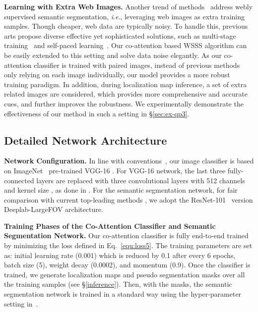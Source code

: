 \documentclass[runningheads]{llncs}
\newcommand{\ie}{\textit{i}.\textit{e}.}
\begin{document}
\noindent\textbf{Learning with Extra Web Images.}  Another trend of methods~\cite{jin2017webly,hong2017weakly,shen2018bootstrapping,wei2016stc}  address webly supervised semantic segmentation, \ie, leveraging web images as extra training samples. Though cheaper,  web data are typically noisy. To handle this,  previous arts propose diverse effective yet sophisticated solutions, such as multi-stage training~\cite{jin2017webly} and self-paced learning~\cite{wei2016stc}. Our co-attention based WSSS algorithm can be easily extended to this setting and solve data noise elegantly. As our co-attention classifier is trained with paired images, instead of previous methods  only relying on each image individually, our model provides a more robust training paradigm. In addition, during localization map inference, a set of extra related images are considered, which provides more comprehensive and accurate cues, and further improves the robustness. We experimentally demonstrate the effectiveness of our method in such a setting in \S\ref{sec:ex-qp3}.





\vspace{-6pt}
\subsection{Detailed Network Architecture}
\vspace{-2pt}
\noindent\textbf{Network Configuration.} In line with conventions~\cite{wei2018revisiting,zhang2018adversarial,oaa2019}, our image classifier is based on ImageNet~\cite{krizhevsky2012imagenet} pre-trained VGG-16 \cite{vgg}. For VGG-16 network, the last three fully-connected layers are replaced with three convolutional layers with 512 channels and kernel size , as done in \cite{oaa2019,zhang2018adversarial}.
For the semantic segmentation network, for fair comparison with current top-leading methods \cite{oaa2019,ssdd2019,lee2019ficklenet,psa2018}, we adopt
the ResNet-101~\cite{he2016deep} version Deeplab-LargeFOV architecture.

\noindent\textbf{Training Phases of the Co-Attention Classifier and Semantic Segmentation Network. } Our co-attention classifier is fully end-to-end trained by minimizing the loss defined in Eq.~\ref{equ:loss5}. The training parameters are set as: initial learning rate (0.001) which is reduced by 0.1 after every 6 epochs, batch size (5), weight decay (0.0002), and momentum (0.9). Once the classifier is trained, we generate localization maps and pseudo segmentation masks over all the training samples   (see \S\ref{inference}). Then, with the masks,  the semantic segmentation network is trained in a standard way \cite{oaa2019} using the hyper-parameter setting in~\cite{chen2017deeplab}.
\end{document}
